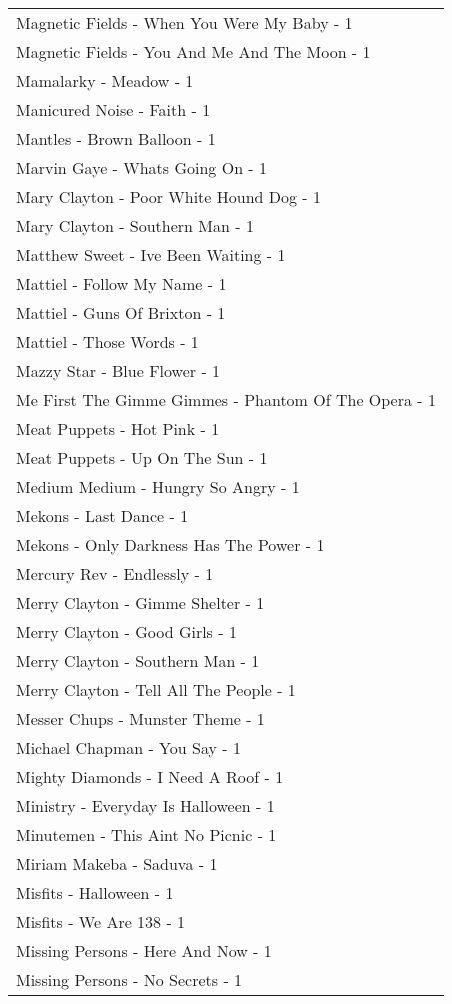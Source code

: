 \documentclass[
]{article}
\begin{document}
\begin{longtable}{l}
Magnetic Fields - When You Were My Baby - 1 \\ 
Magnetic Fields - You And Me And The Moon - 1 \\ 
Mamalarky - Meadow - 1 \\ 
Manicured Noise - Faith - 1 \\ 
Mantles - Brown Balloon - 1 \\ 
Marvin Gaye - Whats Going On - 1 \\ 
Mary Clayton - Poor White Hound Dog - 1 \\ 
Mary Clayton - Southern Man - 1 \\ 
Matthew Sweet - Ive Been Waiting - 1 \\ 
Mattiel - Follow My Name - 1 \\ 
Mattiel - Guns Of Brixton - 1 \\ 
Mattiel - Those Words - 1 \\ 
Mazzy Star - Blue Flower - 1 \\ 
Me First The Gimme Gimmes - Phantom Of The Opera - 1 \\ 
Meat Puppets - Hot Pink - 1 \\ 
Meat Puppets - Up On The Sun - 1 \\ 
Medium Medium - Hungry So Angry - 1 \\ 
Mekons - Last Dance - 1 \\ 
Mekons - Only Darkness Has The Power - 1 \\ 
Mercury Rev - Endlessly - 1 \\ 
Merry Clayton - Gimme Shelter - 1 \\ 
Merry Clayton - Good Girls - 1 \\ 
Merry Clayton - Southern Man - 1 \\ 
Merry Clayton - Tell All The People - 1 \\ 
Messer Chups - Munster Theme - 1 \\ 
Michael Chapman - You Say - 1 \\ 
Mighty Diamonds - I Need A Roof - 1 \\ 
Ministry - Everyday Is Halloween - 1 \\ 
Minutemen - This Aint No Picnic - 1 \\ 
Miriam Makeba - Saduva - 1 \\ 
Misfits - Halloween - 1 \\ 
Misfits - We Are 138 - 1 \\ 
Missing Persons - Here And Now - 1 \\ 
Missing Persons - No Secrets - 1 \\ 

\end{longtable}
\end{document}
